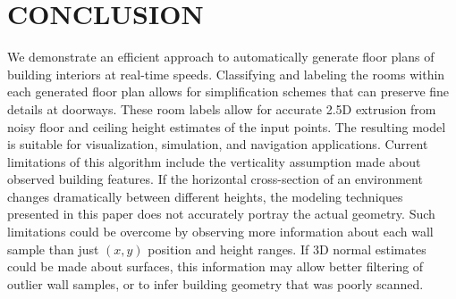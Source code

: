 \documentclass[a4paper,twoside]{article}
\begin{document}
\section{\uppercase{Conclusion}}
\label{sec:conclusion}

\noindent We demonstrate an efficient approach to automatically generate floor plans of building interiors at real-time speeds.  Classifying and labeling the rooms within each generated floor plan allows for simplification schemes that can preserve fine details at doorways.  These room labels allow for accurate 2.5D extrusion from noisy floor and ceiling height estimates of the input points.  The resulting model is suitable for visualization, simulation, and navigation applications.  Current limitations of this algorithm include the verticality assumption made about observed building features.  If the horizontal cross-section of an environment changes dramatically between different heights, the modeling techniques presented in this paper does not accurately portray the actual geometry.  Such limitations could be overcome by observing more information about each wall sample than just $(x,y)$ position and height ranges.  If 3D normal estimates could be made about surfaces, this information may allow better filtering of outlier wall samples, or to infer building geometry that was poorly scanned.




{\small
}

\vfill
\end{document}
